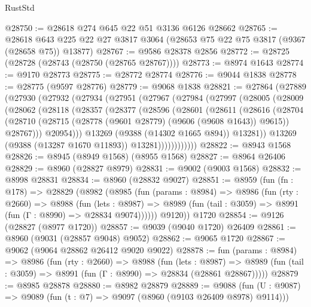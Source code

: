 \begin{lexlean}{RustStd}
\begin{coremodule}
@28750 := @28618 @274 @645 @22 @51 @3136 @6126 @28662
@28765 := @28618
    @643
    @225
    @22
    @27
    @3817
    @3064
    (@28653 @75 @22 @75 @3817 (@9367 (@28658 @75)) @13877)
@28767 := @9586 @28378 @2856
@28772 := @28725 (@28728 (@28743 (@28750 (@28765 @28767))))
@28773 := @8974 @1643
@28774 := @9170 @28773
@28775 := @28772 @28774
@28776 := @9044 @1838
@28778 := @28775 (@9597 @28776)
@28779 := @9068 @1838
@28821 := @27864
    (@27889
      (@27930
        (@27932
          (@27934
            (@27951
              (@27967
                (@27984
                  (@27997
                    (@28005
                      (@28009
                        (@28062
                          (@28118
                            (@28357
                              (@28377
                                (@28596
                                  (@28601
                                    (@28611
                                      (@28616
                                        (@28704
                                          (@28710
                                            (@28715
                                              (@28778 (@9601 @28779) (@9606 (@9608 @1643)) @9615))
                                            @28767)))
                                      @20954)))
                                @13269
                                (@9388 (@14302 @1665 @894))
                                @13281))
                            @13269
                            (@9388 (@13287 @1670 @11893))
                            @13281))))))))))))
@28822 := @8943 @1568
@28826 := @8945 (@8949 @1568) (@8955 @1568)
@28827 := @8964 @26406
@28829 := @8960 (@28827 @8979)
@28831 := @9002 (@9003 @1568)
@28832 := @8998 @28831
@28834 := @8960 (@28832 @9027)
@28851 := @8959
    (fun (fn : @178) =>
    @28829
      (@8982
        (@8985
          (fun (params : @8984) =>
          @8986
            (fun (rty : @2660) =>
            @8988
              (fun (lets : @8987) =>
              @8989 (fun (tail : @3059) => @8991 (fun (Γ : @8990) => @28834 @9074))))))
        @9120))
    @1720
@28854 := @9126 (@28827 (@8977 @1720))
@28857 := @9039 (@9040 @1720) @26409
@28861 := @8960 (@9031 (@28857 @9048) @9052)
@28862 := @9065 @1720
@28867 := @9062 (@9064 @28862 @26412 @9020 @9022)
@28878 := fun (params : @8984) =>
  @8986
    (fun (rty : @2660) =>
    @8988
      (fun (lets : @8987) =>
      @8989 (fun (tail : @3059) => @8991 (fun (Γ : @8990) => @28834 (@28861 @28867)))))
@28879 := @8985 @28878
@28880 := @8982 @28879
@28889 := @9088
    (fun (U : @9087) => @9089 (fun (t : @7) => @9097 (@8960 (@9103 @26409 @8978) @9114)))

\end{coremodule}
\end{lexlean}
